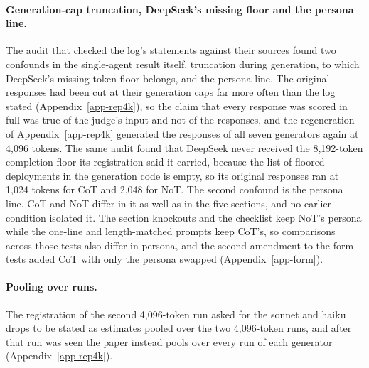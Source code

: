 \paragraph{Generation-cap truncation, DeepSeek's missing floor and the persona line.}
The audit that checked the log's statements against their sources found two
confounds in the single-agent result itself, truncation during generation, to
which DeepSeek's missing token floor belongs, and the persona line. The
original responses had been cut at their generation caps far more often than
the log stated (Appendix~\ref{app-rep4k}), so the claim that every response
was scored in full was true of the judge's input and not of the responses,
and the regeneration of Appendix~\ref{app-rep4k} generated the responses of
all seven generators again at 4,096 tokens.
The same audit found that DeepSeek never received the 8,192-token completion
floor its registration said it carried, because the list of floored
deployments in the generation code is empty, so its original responses ran at
1,024 tokens for CoT and 2,048 for NoT.
The second confound is the persona line. CoT and NoT differ in it as well as
in the five sections, and no earlier condition isolated it. The section
knockouts and the checklist keep NoT's persona while the one-line and
length-matched prompts keep CoT's, so comparisons across those tests also
differ in persona, and the second amendment to the form tests added CoT with
only the persona swapped
(Appendix~\ref{app-form}).

\paragraph{Pooling over runs.}
The registration of the second 4,096-token run asked for the sonnet and haiku
drops to be stated as estimates pooled over the two 4,096-token runs, and
after that run was seen the paper instead pools over every run of each
generator (Appendix~\ref{app-rep4k}).


